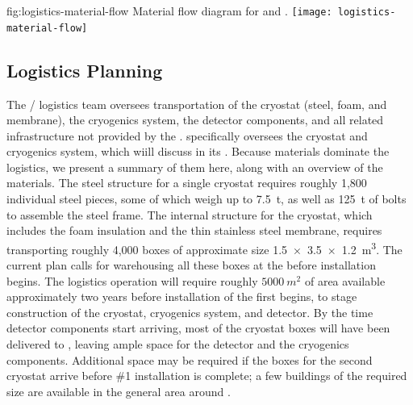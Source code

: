  
\begin{dunefigure}
{fig:logistics-material-flow}
  {Material flow diagram for  and . }
 \texttt{[image: logistics-material-flow]}
\end{dunefigure}

\subsection{Logistics Planning}
\label{sec:fdsp-tc-logPln}

The / logistics team oversees transportation of the cryostat (steel, foam, and membrane), the cryogenics system, the  detector components, and all related infrastructure not provided by the . 
 specifically oversees the cryostat and cryogenics system, which  wiill discuss in its %
. Because  materials dominate the logistics, we present a summary of them here, along with an overview of the  materials.  
The steel structure for a single  cryostat requires roughly 1,800 individual steel pieces,  some of which weigh up to \SI{7.5}{t}, as well as \SI{125}{t} of bolts to assemble the steel frame. 
The internal structure for the cryostat, which includes the foam insulation and the thin stainless steel membrane, requires transporting roughly 4,000 boxes of approximate size  \SI{1.5x3.5x1.2}{\cubic\meter}. %
 The current plan calls for warehousing all these boxes at the  before installation begins. 
The logistics operation will require roughly $\SI{5000}{m^2}$ of area available approximately two years before installation of the first  begins, to stage construction of the cryostat, cryogenics system, and detector. 
By the time detector components start arriving, most of the cryostat boxes will have been delivered to , leaving ample space for the detector and the cryogenics components. 
Additional space may be required if the boxes for the second cryostat arrive before   \#1 installation is complete; a few buildings of the required size are available in the general area around . 

